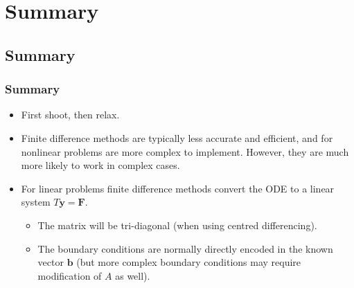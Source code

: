 \documentclass{beamer}
\newcommand{\bb}{{\boldsymbol{b}}}
\newcommand{\by}{{\boldsymbol{y}}}
\newcommand{\bfm}[1]{{\boldsymbol{#1}}}
\begin{document}
\section{Summary}

\subsection{Summary}

\begin{frame}
  \frametitle{Summary}

  \begin{itemize}
  \item First shoot, then relax.
  \item Finite difference methods are typically less accurate and
    efficient, and for nonlinear problems are more complex to
    implement. However, they are much more likely to work in complex
    cases.
  \item For linear problems finite difference methods convert the ODE
    to a linear system $T \by = \bfm{F}$.
    \begin{itemize}
    \item The matrix will be tri-diagonal (when using centred
      differencing).
    \item The boundary conditions are normally directly encoded in the
      known vector $\bb$ (but more complex boundary conditions may
      require modification of $A$ as well).
    \end{itemize}
  \end{itemize}

\end{frame}
\end{document}
